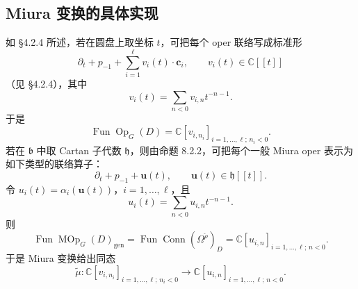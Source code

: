 
\subsection{Miura 变换的具体实现}

如 §4.2.4 所述，若在圆盘上取坐标 $t$，可把每个 oper 联络写成标准形
\[
    \partial_t+p_{-1}+\sum_{i=1}^{\ell}v_i(t)\cdot\mathbf c_i,\qquad v_i(t)\in\mathbb C[[t]]
\]
（见 §4.2.4），其中
\[
    v_i(t)=\sum_{n<0}v_{i,n}t^{-n-1}.
\]
于是
\[
    \operatorname{Fun}\operatorname{Op}_G(D)=\mathbb C[v_{i,n_i}]_{i=1,\dots,\ell;\,n_i<0}.
\]
若在 $\mathfrak b$ 中取 Cartan 子代数 $\mathfrak h$，则由命题 8.2.2，可把每个一般 Miura oper 表示为如下类型的联络算子：
\begin{equation}
    \partial_t+p_{-1}+\mathbf u(t),\qquad \mathbf u(t)\in\mathfrak h[\![t]\!].
    \tag{8.2-4}
\end{equation}
令 $u_i(t)=\alpha_i(\mathbf u(t))$，$i=1,\dots,\ell$，且
\[
    u_i(t)=\sum_{n<0}u_{i,n}t^{-n-1}.
\]
则
\[
    \operatorname{Fun}\operatorname{MOp}_G(D)_{\mathrm{gen}}=\operatorname{Fun}\operatorname{Conn}(\Omega^{\check\rho})_D=\mathbb C[u_{i,n}]_{i=1,\dots,\ell;\,n<0}.
\]
于是 Miura 变换给出同态
\begin{equation}
    \tilde\mu:\mathbb C[v_{i,n_i}]_{i=1,\dots,\ell;\,n_i<0}\longrightarrow\mathbb C[u_{i,n}]_{i=1,\dots,\ell;\,n<0}.
    \tag{8.2-5}
\end{equation}

